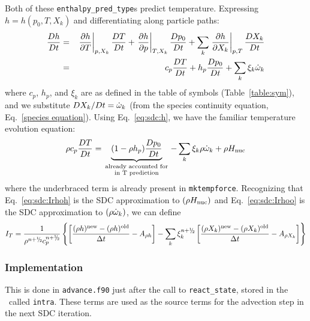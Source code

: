 \begin{itemize}
Both of these {\tt enthalpy\_pred\_type}s predict temperature.  Expressing
$h = h(p_0,T,X_k)$ and differentiating along particle paths:
\begin{eqnarray}
\frac{Dh}{Dt} &=& \left . \frac{\partial h}{\partial T} \right |_{p,X_k} \frac{DT}{Dt} +
                  \left . \frac{\partial h}{\partial p} \right |_{T,X_k} \frac{Dp_0}{Dt} +
           \sum_k \left . \frac{\partial h}{\partial X_k} \right |_{p,T} \frac{DX_k}{Dt} \\
              &=& c_p \frac{DT}{Dt} + h_p  \frac{Dp_0}{Dt} + \sum_k \xi_k \dot{\omega}_k
\end{eqnarray}
where $c_p$, $h_p$, and $\xi_k$ are as defined in the table of symbols
(Table~\ref{table:sym}), and we substitute $DX_k/Dt = \dot{\omega}_k$ (from the species
continuity equation, Eq.~\ref{species equation}).  Using Eq.~\ref{eq:sdc:h}, we have
the familiar temperature evolution equation:
\begin{equation}
\rho c_p \frac{DT}{Dt} = \underbrace{(1 - \rho h_p) \frac{Dp_0}{Dt}}_{\begin{smallmatrix}\text{already~accounted~for} \\ \text{in~T~prediction}\end{smallmatrix}} - \sum_k \xi_k \rho \dot{\omega}_k + \rho {H_{\rm nuc}}
\end{equation}
where the underbraced term is already present in {\tt mktempforce}.  Recognizing that
Eq.~\ref{eq:sdc:Irhoh} is the SDC approximation to $(\rho {H_{\rm nuc}})$ and Eq.~\ref{eq:sdc:Irhoo} is the 
SDC approximation to $(\rho \dot{\omega}_k)$, we can define
\begin{equation}
I_T = \frac{1}{\rho^{n+\myhalf} c_p^{n+\myhalf}} \left \{
  \left [ \frac{(\rho h)^\mathrm{new} - (\rho h)^\mathrm{old}}{\Delta t} - A_{\rho h} \right ]
  - \sum_k \xi_k^{n+\myhalf} \left [      \frac{(\rho X_k)^\mathrm{new} - 
            (\rho X_k)^\mathrm{old}}{\Delta t} - A_{\rho X_k}  \right ] \right \}
\end{equation}



\end{itemize}


\subsubsection{Implementation}

This is done in {\tt advance.f90} just after the call to {\tt react\_state},
stored in the \multifab\ called {\tt intra}.
These terms are used as the source terms for the
advection step in the next SDC iteration.

